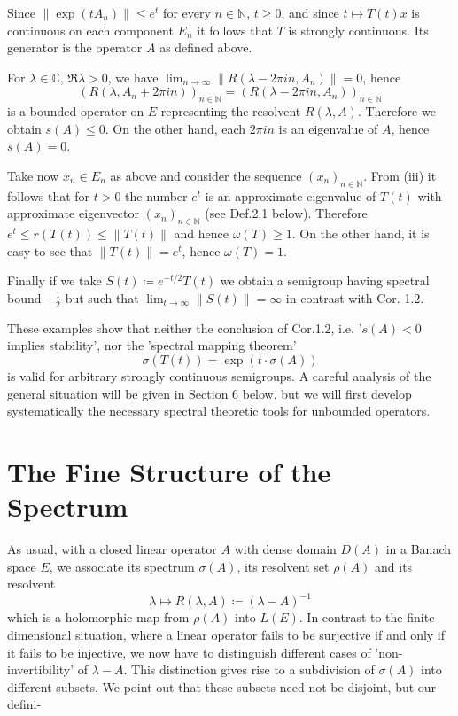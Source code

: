 \newpage

Since $\|\exp(tA_{n})\| \leq e^{t}$ for every $n \in \mathbb{N}$, $t \geq 0$, and since $t \mapsto T(t)x$ is continuous on each component $E_{n}$ it follows that $T$ is strongly continuous.
Its generator is the operator $A$ as defined above.

For $\lambda \in \mathbb{C}$, $\Re\lambda > 0$, we have $\lim_{n \to \infty} \|R(\lambda-2\pi in,A_{n})\| = 0$, hence
\[
    (R(\lambda,A_{n}+2\pi in))_{n \in \mathbb{N}} = (R(\lambda-2\pi in,A_{n}))_{n \in \mathbb{N}}
\]
is a bounded operator on $E$ representing the resolvent $R(\lambda,A)$.
Therefore we obtain $s(A) \leq 0$.
On the other hand, each $2\pi in$ is an eigenvalue of $A$, hence $s(A) = 0$.

Take now $x_{n} \in E_{n}$ as above and consider the sequence $(x_{n})_{n \in \mathbb{N}}$.
From (iii) it follows that for $t > 0$ the number $e^{t}$ is an approximate eigenvalue of $T(t)$ with approximate eigenvector $(x_{n})_{n \in \mathbb{N}}$ (see Def.2.1 below).
Therefore $e^{t} \leq r(T(t)) \leq \|T(t)\|$ and hence $\omega(T) \geq 1$.
On the other hand, it is easy to see that $\|T(t)\| = e^{t}$, hence $\omega(T) = 1$.

Finally if we take $S(t) \coloneqq e^{-t/2}T(t)$ we obtain a semigroup having spectral bound $-\frac{1}{2}$ but such that $\lim_{t \to \infty} \|S(t)\| = \infty$ in contrast with Cor. 1.2.

These examples show that neither the conclusion of Cor.1.2, i.e. '$s(A) < 0$ implies stability', nor the 'spectral mapping theorem'
\[
    \sigma(T(t)) = \exp(t\cdot\sigma(A))
\]
is valid for arbitrary strongly continuous semigroups.
A careful analysis of the general situation will be given in Section 6 below, but we will first develop systematically the necessary spectral theoretic tools for unbounded operators.
\section{The Fine Structure of the Spectrum}\label{sec:a3-2}

As usual, with a closed linear operator $A$ with dense domain $D(A)$ in a Banach space $E$, we associate its spectrum $\sigma(A)$, its resolvent set $\rho(A)$ and its resolvent
\[
    \lambda \mapsto R(\lambda,A) \coloneqq (\lambda - A)^{-1}
\]
which is a holomorphic map from $\rho(A)$ into $L(E)$.
In contrast to the finite dimensional situation, where a linear operator fails to be surjective if and only if it fails to be injective, we now have to distinguish different cases of 'non-invertibility' of $\lambda - A$.
This distinction gives rise to a subdivision of $\sigma(A)$ into different subsets.
We point out that these subsets need not be disjoint, but our defini-



